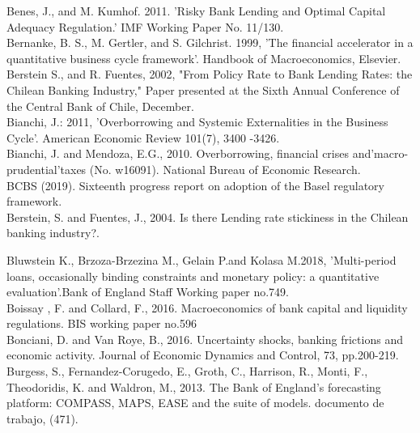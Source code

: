 \documentclass[12pt]{article}
\numberwithin{equation}{section}
\begin{document}
Benes, J., and M. Kumhof. 2011. 'Risky Bank Lending and Optimal
Capital Adequacy Regulation.' IMF Working Paper No. 11/130.\\


Bernanke, B. S., M. Gertler, and S. Gilchrist. 1999, 'The financial accelerator in a quantitative business cycle framework'. Handbook of Macroeconomics, Elsevier.\\

Berstein S., and R. Fuentes, 2002, "From Policy Rate to Bank Lending Rates: the Chilean Banking Industry," Paper presented at the Sixth Annual Conference of the Central Bank of Chile, December.\\

Bianchi, J.: 2011, 'Overborrowing and Systemic Externalities in the Business Cycle'.
American Economic Review 101(7), 3400 -3426.\\

Bianchi, J. and Mendoza, E.G., 2010. Overborrowing, financial crises and'macro-prudential'taxes (No. w16091). National Bureau of Economic Research. \\

BCBS (2019). Sixteenth progress report on adoption of the Basel regulatory framework. \\

Berstein, S. and Fuentes, J., 2004. Is there Lending rate stickiness
in the Chilean banking industry?. 

Bluwstein K., Brzoza-Brzezina M., Gelain P.and Kolasa M.2018, 'Multi-period loans, occasionally binding constraints and monetary policy:
a quantitative evaluation'.Bank of England Staff Working paper no.749.\\

Boissay , F. and Collard, F., 2016. Macroeconomics of
bank capital and
liquidity regulations. BIS working paper no.596 \\


Bonciani, D. and Van Roye, B., 2016. Uncertainty shocks, banking frictions and economic activity. Journal of Economic Dynamics and Control, 73, pp.200-219. \\

Burgess, S., Fernandez-Corugedo, E., Groth, C., Harrison, R., Monti, F., Theodoridis, K. and Waldron, M., 2013. The Bank of England’s forecasting platform: COMPASS, MAPS, EASE and the suite of models. documento de trabajo, (471). \\
\end{document}
